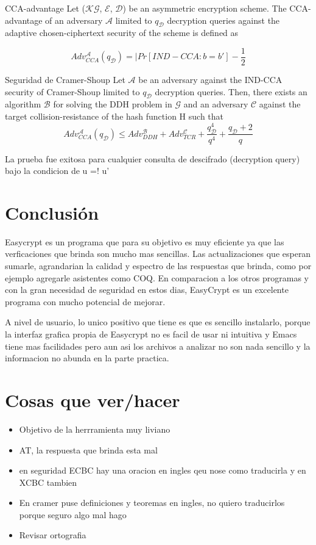 \documentclass[runningheads,a4paper]{llncs}
\begin{document}
\begin{definition}{CCA-advantage}
Let ($\mathcal{K}\mathcal{G}$, $\mathcal{E}$, $\mathcal{D}$) be an asymmetric encryption scheme. The CCA-advantage of an adversary $\mathcal{A}$ limited to $q_\mathcal{D}$ decryption queries against the adaptive chosen-ciphertext security of the scheme is defined as

\[Adv_{CCA}^\mathcal{A} (q_\mathcal{D})= |Pr[IND-CCA: b=b'] - \frac{1}{2}\]
\end{definition}

\begin{theorem}{Seguridad de Cramer-Shoup}
Let $\mathcal{A}$ be an adversary against the IND-CCA security
of Cramer-Shoup limited to $q_\mathcal{D}$ decryption queries. Then, there exists an algorithm $\mathcal{B}$ for solving the
DDH problem in $\mathcal{G}$ and an adversary $\mathcal{C}$ against the target collision-resistance of the hash function H
such that
\[Adv_{CCA}^\mathcal{A}(q_\mathcal{D}) \leq Adv_{DDH}^\mathcal{B} + Adv_{TCR}^\mathcal{C} + \frac{q_\mathcal{D}^4}{q^4} + \frac{q_\mathcal{D} + 2}{q}\]
\end{theorem}
La prueba fue exitosa para cualquier consulta de descifrado (decryption query) bajo la condicion de u =! u'\cite{article3}


\section{Conclusión}


Easycrypt es un programa que para su objetivo es muy eficiente ya que las verficaciones que brinda son mucho mas sencillas. Las actualizaciones que esperan sumarle, agrandarian la calidad y espectro de las respuestas que brinda, como por ejemplo agregarle asistentes como COQ. En comparacion a los otros programas y con la gran necesidad de seguridad en estos dias, EasyCrypt es un excelente programa con mucho potencial de mejorar.

A nivel de usuario, lo unico positivo que tiene es que es sencillo instalarlo, porque la interfaz grafica propia de Easycrypt no es facil de usar ni intuitiva y Emacs tiene mas facilidades pero aun asi los archivos a analizar no son nada sencillo y la informacion no abunda en la parte practica.

\section{Cosas que ver/hacer}
\begin{itemize}
	\item Objetivo de la herrramienta muy liviano
	\item AT, la respuesta que brinda esta mal
	\item en seguridad ECBC hay una oracion en ingles qeu nose como traducirla y en XCBC tambien
	\item En cramer puse definiciones y teoremas en ingles, no quiero traducirlos porque seguro algo mal hago
	\item Revisar ortografia
\end{itemize}
\end{document}
